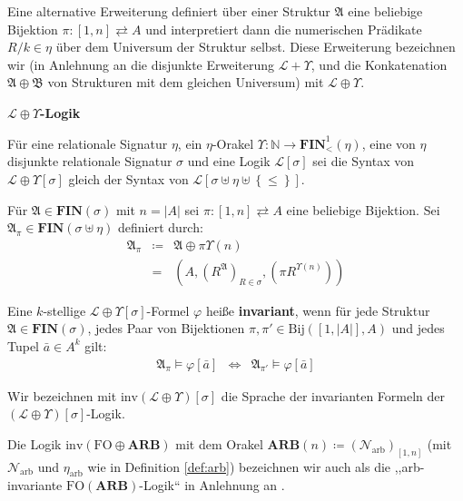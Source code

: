 Eine alternative Erweiterung definiert über einer Struktur $\mathfrak{A}$
eine beliebige Bijektion $\pi:\left[1,n\right]\rightleftarrows A$
und interpretiert dann die numerischen Prädikate $R/k\in\eta$ über
dem Universum der Struktur selbst. Diese Erweiterung bezeichnen wir
(in Anlehnung an die disjunkte Erweiterung $\mathcal{L}+\Upsilon$,
und die Konkatenation $\mathfrak{A}\oplus\mathfrak{B}$ von Strukturen
mit dem gleichen Universum) mit $\mathcal{L}\oplus\Upsilon$.
\begin{defn}
\textbf{$\mathcal{L}\oplus\Upsilon$-Logik}

Für eine relationale Signatur $\eta$, ein $\eta$-Orakel $\Upsilon:\mathbb{N}\rightarrow\mathbf{FIN}_{<}^{1}\left(\eta\right)$,
eine von $\eta$ disjunkte relationale Signatur $\sigma$ und eine
Logik $\mathcal{L}\left[\sigma\right]$ sei die Syntax von $\mathcal{L}\oplus\Upsilon\left[\sigma\right]$
gleich der Syntax von $\mathcal{L}\left[\sigma\uplus\eta\uplus\left\{ \leqslant\right\} \right]$.

Für $\mathfrak{A}\in\mathbf{FIN}\left(\sigma\right)$ mit $n=\left|A\right|$
sei $\pi:\left[1,n\right]\rightleftarrows A$ eine beliebige Bijektion.
Sei $\mathfrak{A}_{\pi}\in\mathbf{FIN}\left(\sigma\uplus\eta\right)$
definiert durch:
\begin{eqnarray*}
\mathfrak{A}_{\pi} & \coloneqq & \mathfrak{A}\oplus\pi\Upsilon\left(n\right)\\
 & = & \left(A,\left(R^{\mathfrak{A}}\right)_{R\in\sigma},\left(\pi R^{\Upsilon\left(n\right)}\right)\right)
\end{eqnarray*}

Eine $k$-stellige $\mathcal{L}\oplus\Upsilon\left[\sigma\right]$-Formel
$\varphi$ heiße \textbf{invariant}, wenn für jede Struktur $\mathfrak{A}\in\mathbf{FIN}\left(\sigma\right)$,
jedes Paar von Bijektionen $\pi,\pi'\in\mathrm{Bij}\left(\left[1,\left|A\right|\right],A\right)$
und jedes Tupel $\bar{a}\in A^{k}$ gilt:
\begin{eqnarray*}
\mathfrak{A}_{\pi}\models\varphi\left[\bar{a}\right] & \Longleftrightarrow & \mathfrak{A}_{\pi'}\models\varphi\left[\bar{a}\right]
\end{eqnarray*}

Wir bezeichnen mit $\mathrm{inv}\left(\mathcal{L}\oplus\Upsilon\right)\left[\sigma\right]$
die Sprache der invarianten Formeln der $\left(\mathcal{L}\oplus\Upsilon\right)\left[\sigma\right]$-Logik.
\end{defn}
%
\begin{notation}
Die Logik $\mathrm{inv}\left(\mathrm{FO}\oplus\mathbf{ARB}\right)$
mit dem Orakel $\mathbf{ARB}\left(n\right)\coloneqq\left(\mathcal{N}_{\mathrm{arb}}\right)_{\left[1,n\right]}$
(mit $\mathcal{N}_{\mathrm{arb}}$ und $\eta_{\mathrm{arb}}$ wie
in Definition \ref{def:arb}) bezeichnen wir auch als die ,,arb-invariante
$\mathrm{FO}\left(\mathbf{ARB}\right)$-Logik`` in Anlehnung an \cite{Schweikardt13ashort,AMSS2012-locality}.
\end{notation}
